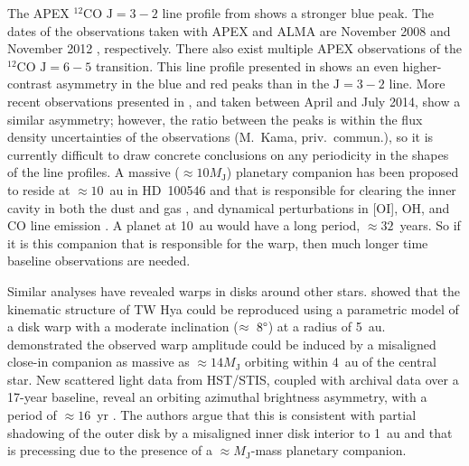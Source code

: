 \documentclass[onecolumn]{aastex6}
\begin{document}
The APEX $^{12}$CO $\mathrm{J}=3-2$ line profile from \citet{panic10}
shows a stronger blue peak.
The dates of the observations taken with
APEX and ALMA are November 2008 \citep[][]{panic10} and
November 2012 \citep[][]{walsh14}, respectively.
There also exist multiple APEX observations of
the $^{12}$CO $\mathrm{J}=6-5$ transition.
This line profile presented in
\citep{panic10} shows an even higher-contrast asymmetry in the blue and red
peaks than in the $\mathrm{J}=3-2$ line.
More recent observations presented in \citet{kama16}, and taken
between April and July 2014, show a similar asymmetry; however,
the ratio between the peaks is within the flux density uncertainties
of the observations (M.~Kama, priv.~commun.), so it is currently difficult to draw concrete conclusions
on any periodicity in the shapes of the line profiles.
A massive ($\approx 10 M_\mathrm{J}$) planetary companion has been proposed to reside
at $\approx 10$~au in HD~100546 and that is responsible for clearing the inner cavity in both
the dust and gas \citep{mulders13,panic14,walsh14,pinilla15,wright15,garufi16},
and dynamical perturbations in [OI], OH, and CO line emission
\citep{acke06,vanderplas09,brittain14}.
A planet at 10~au would have a long period, $\approx 32$~years.
So if it is this companion that is responsible for the warp, then
much longer time baseline observations are needed.

Similar analyses have revealed warps in disks around other stars.
\citet{rosenfeld12} showed that the kinematic structure of TW Hya
could be reproduced using a parametric model of a disk warp
with a moderate inclination ($\approx~8\degree$) at a radius of 5~au.
\citet{facchini14} demonstrated the observed warp amplitude
could be induced by a misaligned close-in companion as massive as
$\approx 14M_\mathrm{J}$ orbiting within 4~au of the central star.
New scattered light data from HST/STIS, coupled with
archival data over a 17-year baseline, reveal an orbiting
azimuthal brightness asymmetry, with a
period of $\approx 16$~yr \citep{debes17}.
The authors argue that this is consistent with partial
shadowing of the outer disk by a misaligned inner
disk interior to 1~au and that is precessing due to
the presence of a $\approx M_\mathrm{J}$-mass planetary companion.
\end{document}
